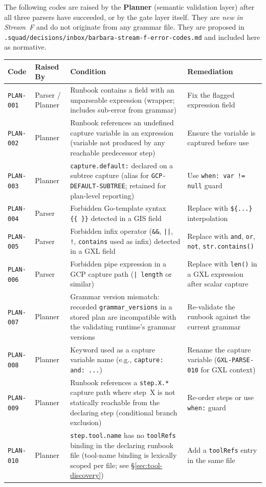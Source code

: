 The following codes are raised by the \textbf{Planner} (semantic validation
layer) after all three parsers have succeeded, or by the gate layer itself.
They are \emph{new in Stream~F} and do not originate from any grammar file.
They are proposed in
\texttt{.squad/decisions/inbox/barbara-stream-f-error-codes.md} and included
here as normative.

\begin{center}\small
\begin{tabular}{p{2.8cm}p{1.8cm}p{6.0cm}p{3.7cm}}
\hline
\textbf{Code} & \textbf{Raised By} & \textbf{Condition} & \textbf{Remediation} \\
\hline
\texttt{PLAN-001} & Parser / Planner & Runbook contains a field with an unparseable expression (wrapper; includes sub-error from grammar) & Fix the flagged expression field \\
\texttt{PLAN-002} & Planner & Runbook references an undefined capture variable in an expression (variable not produced by any reachable predecessor step) & Ensure the variable is captured before use \\
\texttt{PLAN-003} & Planner & \texttt{capture.default:} declared on a subtree capture (alias for \texttt{GCP-DEFAULT-SUBTREE}; retained for plan-level reporting) & Use \texttt{when: var != null} guard \\
\texttt{PLAN-004} & Parser  & Forbidden Go-template syntax \texttt{\{\{\ \}\}} detected in a GIS field & Replace with \texttt{\$\{...\}} interpolation \\
\texttt{PLAN-005} & Parser  & Forbidden infix operator (\texttt{\&\&}, \texttt{||}, \texttt{!}, \texttt{contains} used as infix) detected in a GXL field & Replace with \texttt{and}, \texttt{or}, \texttt{not}, \texttt{str.contains()} \\
\texttt{PLAN-006} & Parser  & Forbidden pipe expression in a GCP capture path (\texttt{|\ length} or similar) & Replace with \texttt{len()} in a GXL expression after scalar capture \\
\texttt{PLAN-007} & Planner & Grammar version mismatch: recorded \texttt{grammar\_versions} in a stored plan are incompatible with the validating runtime's grammar versions & Re-validate the runbook against the current grammar \\
\texttt{PLAN-008} & Planner & Keyword used as a capture variable name (e.g., \texttt{capture: and: ...}) & Rename the capture variable (\texttt{GXL-PARSE-010} for GXL context) \\
\texttt{PLAN-009} & Planner & Runbook references a \texttt{step.X.*} capture path where step~X is not statically reachable from the declaring step (conditional branch exclusion) & Re-order steps or use \texttt{when:} guard \\
\texttt{PLAN-010} & Planner & \texttt{step.tool.name} has no \texttt{toolRefs} binding in the declaring runbook file (tool-name binding is lexically scoped per file; see \S\ref{sec:tool-discovery}) & Add a \texttt{toolRefs} entry in the same file \\
\hline
\end{tabular}
\end{center}

